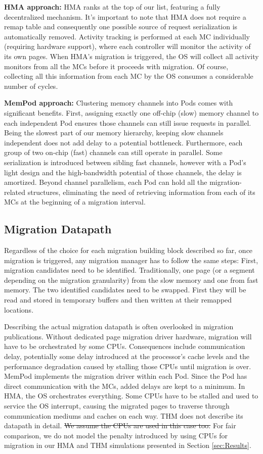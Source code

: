 	\textbf{HMA approach:} HMA ranks at the top of our list, featuring a fully decentralized mechanism. It's important to note that HMA does not require a remap table and consequently one possible source of request serialization is automatically removed. Activity tracking is performed at each MC individually (requiring hardware support), where each controller will monitor the activity of its own pages. When HMA's migration is triggered, the OS will collect all activity monitors from all the MCs before it proceeds with migration. Of course, collecting all this information from each MC by the OS consumes a considerable number of cycles.

	\textbf{MemPod approach:} Clustering memory channels into Pods comes with significant benefits. First, assigning exactly one off-chip (slow) memory channel to each independent Pod ensures those channels can still issue requests in parallel. Being the slowest part of our memory hierarchy, keeping slow channels independent does not add delay to a potential bottleneck. Furthermore, each group of two on-chip (fast) channels can still operate in parallel. Some serialization is introduced between sibling fast channels, however with a Pod's light design and the high-bandwidth potential of those channels, the delay is amortized. Beyond channel parallelism, each Pod can hold all the migration-related structures, eliminating the need of retrieving information from each of its MCs at the beginning of a migration interval.
	

\subsection{Migration Datapath}
Regardless of the choice for each migration building block described so far, once migration is triggered, any migration manager has to follow the same steps: First, migration candidates need to be identified. Traditionally, one page (or a segment depending on the migration granularity) from the slow memory and one from fast memory. The two identified candidates need to be swapped. First they will be read and stored in temporary buffers and then written at their remapped locations. 

Describing the actual migration datapath is often overlooked in migration publications. Without dedicated page migration driver hardware, migration will have to be orchestrated by some CPUs. Consequences include communication delay, potentially some delay introduced at the processor's cache levels and the performance degradation caused by stalling those CPUs until migration is over. MemPod implements the migration driver within each Pod. Since the Pod has direct communication with the MCs, added delays are kept to a minimum. In HMA, the OS orchestrates everything. Some CPUs have to be stalled and used to service the OS interrupt, causing the migrated pages to traverse through communication mediums and caches on each way. THM does not describe its datapath in detail. \sout{We assume the CPUs are used in this case too.} For fair comparison, we do not model the penalty introduced by using CPUs for migration in our HMA and THM simulations presented in Section \ref{sec:Results}.

